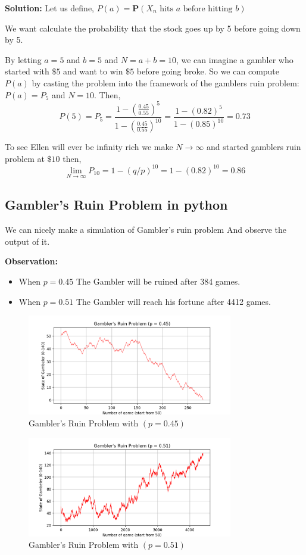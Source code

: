 \textbf{Solution: } Let us define,
$ P(a) = \mathbf{P}\left(X_{n} \text{ hits }a \text{ before hitting } b\right)$ 

We want calculate the probability that the stock goes up by 5 before going down by 5.

By letting $ a=5 $ and $ b=5 $ and $ N=a+b=10 $, we can imagine a gambler who started with $ \$5 $ and want to win $ \$5 $
before going broke. So we can compute $P(a)$ by casting the problem into the framework of the gamblers ruin problem: 
$ P(a) = P_{5} $ and $ N=10 $. Then,
\[
    P(5) = P_{5} = \frac{1-\left(\frac{0.45}{0.55}\right)^{5}}{1-\left(\frac{0.45}{0.55}\right)^{10}} = \frac{1-(0.82)^{5}}{1-(0.85)^{10}} = 0.73
\]

To see Ellen will ever be infinity rich we make  $ N\to\infty $ and started gamblers ruin problem at $ \$10 $ then,
\[
    \lim_{N\to\infty}P_{10} = 1 - (q/p)^{10} = 1 - (0.82)^{10} = 0.86
\]


\subsection{Gambler's Ruin Problem in python}
We can nicely make a simulation of Gambler's ruin problem And observe the output of it.

\textbf{Observation: }
\begin{itemize}
    \item When $ p=0.45 $ The Gambler will be ruined after 384 games.
    \item When $ p=0.51 $ The Gambler will reach his fortune after 4412 games.
\end{itemize}


\begin{figure}[H]
    \centering
    \includegraphics[width=0.8\textwidth]{pic/GR0.45.png}
    \caption{Gambler's Ruin Problem with $( p=0.45 )$}
\end{figure}

\makeatletter
\setlength{\@fptop}{0pt}
\makeatother

\begin{figure}[H]
    \centering
    \includegraphics[width=0.8\textwidth]{pic/GR0.51.png}
    \caption{Gambler's Ruin Problem with $( p=0.51 )$}
\end{figure}
